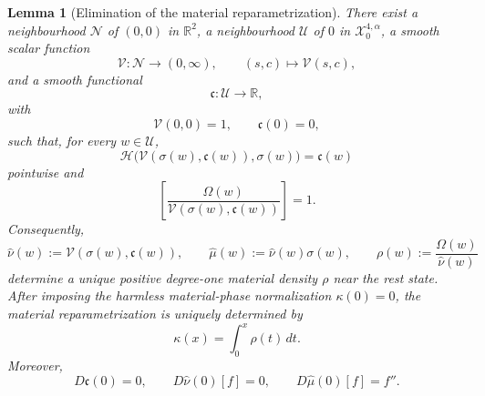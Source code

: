 \documentclass[12pt]{article}
\numberwithin{equation}{section}
\newtheorem{lemma}[theorem]{Lemma}
\numberwithin{equation}{section}
\begin{document}
\begin{lemma}[Elimination of the material reparametrization]\label{lem:materialIFT}
There exist a neighbourhood $\mathcal N$ of $(0,0)$ in $\mathbb R^2$, a neighbourhood
$\mathcal U$ of $0$ in $\mathcal X^{4,\alpha}_0$, a smooth scalar function
\[
\mathcal V:\mathcal N\longrightarrow (0,\infty),
\qquad (s,c)\longmapsto \mathcal V(s,c),
\]
and a smooth functional
\[
\mathfrak c:\mathcal U\longrightarrow\mathbb R,
\]
with
\[
\mathcal V(0,0)=1,\qquad \mathfrak c(0)=0,
\]
such that, for every $w\in\mathcal U$,
\begin{equation}\label{eq2.Vdef}
\mathscr H\bigl(\mathcal V(\sigma(w),\mathfrak c(w)),\sigma(w)\bigr)
=\mathfrak c(w)
\end{equation}
pointwise and
\begin{equation}\label{eq2.periodconstraint}
\left[
\frac{\Omega(w)}
{\mathcal V(\sigma(w),\mathfrak c(w))}
\right]=1.
\end{equation}
Consequently,
\begin{equation}\label{eq2.reducedstrains}
\widehat\nu(w)
:=\mathcal V(\sigma(w),\mathfrak c(w)),
\qquad
\widehat\mu(w):=\widehat\nu(w)\sigma(w),
\qquad
\rho(w):=\frac{\Omega(w)}{\widehat\nu(w)}
\end{equation}
determine a unique positive degree-one material density $\rho$ near the rest state.
After imposing the harmless material-phase normalization $\kappa(0)=0$, the material
reparametrization is uniquely determined by
\[
\kappa(x)=\int_0^x\rho(t)\,dt.
\]
Moreover,
\begin{equation}\label{eq2.firstvariations}
D\mathfrak c(0)=0,\qquad
D\widehat\nu(0)[f]=0,\qquad
D\widehat\mu(0)[f]=f''.
\end{equation}
\end{lemma}
\end{document}
